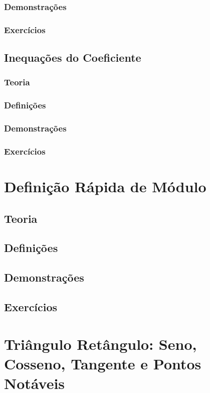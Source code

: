 \documentclass[portuguese, 12pt, a4paper]{article}
\begin{document}
	\subsubsection*{Demonstrações}
	\subsubsection*{Exercícios}
	
	\subsection{Inequações do Coeficiente}
	\subsubsection*{Teoria}
	\subsubsection*{Definições}
	\subsubsection*{Demonstrações}
	\subsubsection*{Exercícios}
	
	\section{Definição Rápida de Módulo}
	\subsection{Teoria}
	\subsection{Definições}
	\subsection{Demonstrações}
	\subsection{Exercícios}
	
	\section{Triângulo Retângulo: Seno, Cosseno, Tangente e Pontos Notáveis}
\end{document}
